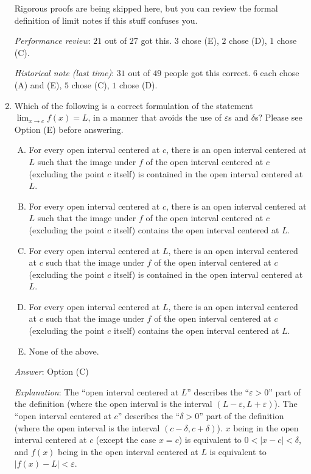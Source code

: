 \documentclass[10pt]{amsart}
\begin{document}
\begin{enumerate}
  Rigorous proofs are being skipped here, but you can review the
  formal definition of limit notes if this stuff confuses you.

  {\em Performance review}: $21$ out of $27$ got this. $3$ chose (E),
  $2$ chose (D), $1$ chose (C).

  {\em Historical note (last time)}: $31$ out of $49$ people got this
  correct. $6$ each chose (A) and (E), $5$ chose (C), $1$ chose (D).

\item Which of the following is a correct formulation of the statement
  $\displaystyle \lim_{x \to c} f(x) = L$, in a manner that avoids the use of
  $\varepsilon$s and $\delta$s? Please see Option (E) before answering.

  \begin{enumerate}[(A)]
  \item For every open interval centered at $c$, there is an open
    interval centered at $L$ such that the image under $f$ of the open
    interval centered at $c$ (excluding the point $c$ itself) is
    contained in the open interval centered at $L$.
  \item For every open interval centered at $c$, there is an open
    interval centered at $L$ such that the image under $f$ of the open
    interval centered at $c$ (excluding the point $c$ itself) contains
    the open interval centered at $L$.
  \item For every open interval centered at $L$, there is an open
    interval centered at $c$ such that the image under $f$ of the open
    interval centered at $c$ (excluding the point $c$ itself) is
    contained in the open interval centered at $L$.
  \item For every open interval centered at $L$, there is an open
    interval centered at $c$ such that the image under $f$ of the open
    interval centered at $c$ (excluding the point $c$ itself) contains
    the open interval centered at $L$.
  \item None of the above.
  \end{enumerate}

  {\em Answer}: Option (C)

  {\em Explanation}: The ``open interval centered at $L$'' describes
  the ``$\varepsilon > 0$'' part of the definition (where the open
  interval is the interval $(L - \varepsilon, L + \varepsilon)$). The ``open
  interval centered at $c$'' describes the ``$\delta > 0$'' part of
  the definition (where the open interval is the interval $(c -
  \delta, c + \delta)$). $x$ being in the open interval centered at
  $c$ (except the case $x = c$) is equivalent to $0 < |x - c| <
  \delta$, and $f(x)$ being in the open interval centered at $L$ is
  equivalent to $|f(x) - L| < \varepsilon$.


\end{enumerate}
\end{document}
